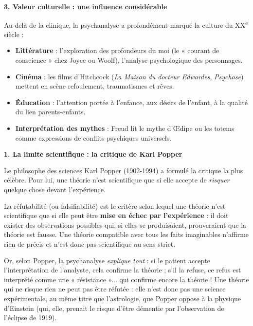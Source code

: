 \documentclass[11pt]{article}
\newcommand{\cle}[1]{{\popxbold\color{popdark}#1}}
\newcounter{popsec}
\newcounter{popsub}
\newcommand{\courssub}[1]{%
  \stepcounter{popsub}%
  \par\vspace{9pt}\noindent{\popxbold\fontsize{11.5}{13}\selectfont\color{popink}{\color{poporange}\thepopsec.\thepopsub}\hspace{6pt}#1}\par\nopagebreak\vspace{4pt}
}
\begin{document}
\textbf{3. Valeur culturelle : une influence considérable}\par

Au-delà de la clinique, la psychanalyse a profondément marqué la culture du XX\textsuperscript{e} siècle :
\begin{itemize}
\item \textbf{Littérature} : l'exploration des profondeurs du moi (le « courant de conscience » chez Joyce ou Woolf), l'analyse psychologique des personnages.
\item \textbf{Cinéma} : les films d'Hitchcock (\emph{La Maison du docteur Edwardes}, \emph{Psychose}) mettent en scène refoulement, traumatismes et rêves.
\item \textbf{Éducation} : l'attention portée à l'enfance, aux désirs de l'enfant, à la qualité du lien parents-enfants.
\item \textbf{Interprétation des mythes} : Freud lit le mythe d'{\OE}dipe ou les totems comme expressions de conflits psychiques universels.
\end{itemize}

\courssub{Les limites de la psychanalyse}

\textbf{1. La limite scientifique : la critique de Karl Popper}\par

Le philosophe des sciences Karl \cle{Popper} (1902-1994) a formulé la critique la plus célèbre. Pour lui, une théorie n'est scientifique que si elle accepte de \emph{risquer} quelque chose devant l'expérience.

\begin{definition}
La \cle{réfutabilité} (ou falsifiabilité) est le critère selon lequel une théorie n'est scientifique que si elle peut être \textbf{mise en échec par l'expérience} : il doit exister des observations possibles qui, si elles se produisaient, prouveraient que la théorie est fausse. Une théorie compatible avec tous les faits imaginables n'affirme rien de précis et n'est donc pas scientifique au sens strict.
\end{definition}

Or, selon Popper, la psychanalyse \emph{explique tout} : si le patient accepte l'interprétation de l'analyste, cela confirme la théorie ; s'il la refuse, ce refus est interprété comme une « résistance »... qui confirme encore la théorie ! Une théorie qui ne risque rien ne peut pas être réfutée : elle n'est donc pas une science expérimentale, au même titre que l'astrologie, que Popper oppose à la physique d'Einstein (qui, elle, prenait le risque d'être démentie par l'observation de l'éclipse de 1919).
\end{document}
